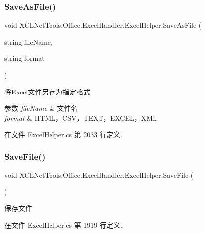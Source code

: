 \subsubsection{\texorpdfstring{Save\+As\+File()}{SaveAsFile()}\hspace{0.1cm}{\footnotesize\ttfamily [3/3]}}
{\footnotesize\ttfamily void X\+C\+L\+Net\+Tools.\+Office.\+Excel\+Handler.\+Excel\+Helper.\+Save\+As\+File (\begin{DoxyParamCaption}\item[{string}]{file\+Name,  }\item[{string}]{format }\end{DoxyParamCaption})}



将\+Excel文件另存为指定格式 


\begin{DoxyParams}{参数}
{\em file\+Name} & 文件名\\
\hline
{\em format} & H\+T\+M\+L，\+C\+S\+V，\+T\+E\+X\+T，\+E\+X\+C\+E\+L，\+X\+ML\\
\hline
\end{DoxyParams}


在文件 Excel\+Helper.\+cs 第 2033 行定义.

\mbox{\label{class_x_c_l_net_tools_1_1_office_1_1_excel_handler_1_1_excel_helper_a85e4eb3e29066ce7d82fab75fcb713ab}} 
\subsubsection{\texorpdfstring{Save\+File()}{SaveFile()}\hspace{0.1cm}{\footnotesize\ttfamily [1/2]}}
{\footnotesize\ttfamily void X\+C\+L\+Net\+Tools.\+Office.\+Excel\+Handler.\+Excel\+Helper.\+Save\+File (\begin{DoxyParamCaption}{ }\end{DoxyParamCaption})}



保存文件 



在文件 Excel\+Helper.\+cs 第 1919 行定义.

